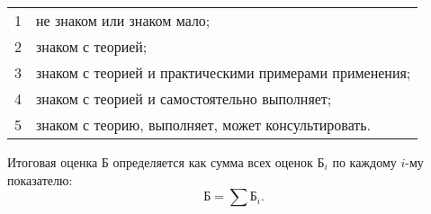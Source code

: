 \medskip
\begin{tabular}{l@{ -- }l}
    1 & не знаком или знаком мало; \\
    2 & знаком с теорией; \\
    3 & знаком с теорией и практическими примерами применения; \\
    4 & знаком с теорией и самостоятельно выполняет; \\
    5 & знаком с теорию, выполняет, может консультировать.
\end{tabular}
\medskip

Итоговая оценка Б определяется как сумма всех оценок $\text{Б}_i$ по каждому $i$-му показателю:
\begin{equation}
    \text{Б} = \sum \text{Б}_i.
\end{equation}

